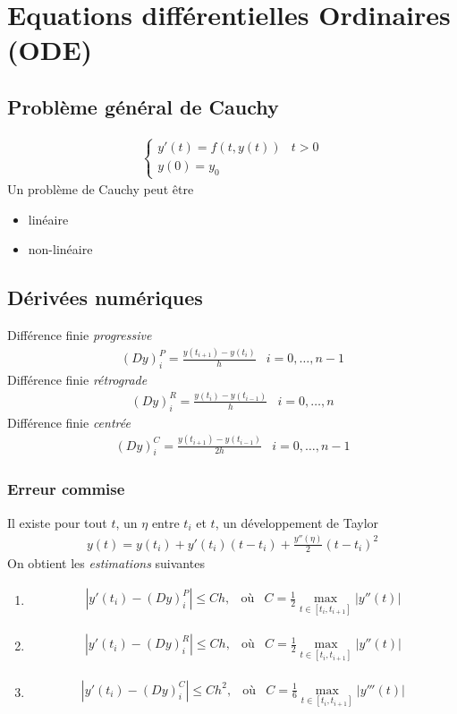 \chapter{Equations différentielles Ordinaires (ODE)}	
\section{Problème général de Cauchy}

\begin{eqnarray}
	\begin{cases}
		y'(t)=f(t,y(t))&t>0
		\\
		y(0)=y_0
	\end{cases}
\end{eqnarray}
Un problème de Cauchy peut être 
\begin{itemize}
	\item linéaire
	\item non-linéaire
\end{itemize}

\section{Dérivées numériques}
Différence finie \emph{progressive}
\begin{eqnarray}
	(Dy)_i^P=\frac{y(t_{i+1})-y(t_i)}{h}&i=0,\dots,n-1
\end{eqnarray}
Différence finie \emph{rétrograde}
\begin{eqnarray}
	(Dy)_i^R=\frac{y(t_{i})-y(t_{i-1})}{h}&i=0,\dots,n	
\end{eqnarray}
Différence finie \emph{centrée}
\begin{eqnarray}
	(Dy)_i^C=\frac{y(t_{i+1})-y(t_{i-1})}{2h}&i=0,\dots,n-1	
\end{eqnarray}


\subsection{Erreur commise}
Il existe pour tout $t$, un $\eta$ entre $t_i$ et $t$, un développement de Taylor
\begin{eqnarray}
	y(t)=y(t_i)+y'(t_i)(t-t_i)+\frac{y''(\eta)}{2}(t-t_i)^2
\end{eqnarray}
On obtient les \emph{estimations} suivantes
\begin{enumerate}
	\item \begin{eqnarray}
		|y'(t_i)-(Dy)_i^P|\leq Ch,&\text{où}&C=\frac{1}{2}\max_{t\in[t_i,t_{i+1}]}|y''(t)|
	\end{eqnarray}
	\item \begin{eqnarray}
		|y'(t_i)-(Dy)_i^R|\leq Ch,&\text{où}&C=\frac{1}{2}\max_{t\in[t_i,t_{i+1}]}|y''(t)|
	\end{eqnarray}
	\item \begin{eqnarray}
		|y'(t_i)-(Dy)_i^C|\leq Ch^2,&\text{où}&C=\frac{1}{6}\max_{t\in[t_i,t_{i+1}]}|y'''(t)|
	\end{eqnarray}
\end{enumerate}


